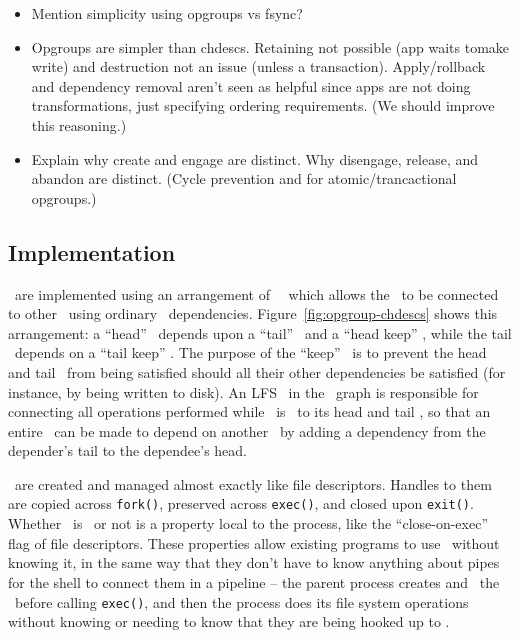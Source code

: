 \begin{itemize}
\item Mention simplicity using opgroups vs fsync?
\item Opgroups are simpler than chdescs. Retaining not possible (app
  waits tomake write) and destruction not an issue (unless a
  transaction). Apply/rollback and dependency removal aren't seen as
  helpful since apps are not doing transformations, just specifying
  ordering requirements. (We should improve this reasoning.)
\item Explain why create and engage are distinct. Why disengage,
  release, and abandon are distinct. (Cycle prevention and for
  atomic/trancactional opgroups.)
\end{itemize}

\subsection{Implementation}
\label{sec:opgroup:implementation}


\Opgroups\ are implemented using an arrangement of \noop\ \chdescs\ which allows
the \opgroup\ to be connected to other \opgroups\ using ordinary \chdesc\
dependencies.  Figure~\ref{fig:opgroup-chdescs} shows this arrangement: a
``head'' \chdesc\ depends upon a ``tail'' \chdesc\ and a ``head keep'' \chdesc,
while the tail \chdesc\ depends on a ``tail keep'' \chdesc. The purpose of the
``keep'' \chdescs\ is to prevent the head and tail \chdescs\ from being
satisfied should all their other dependencies be satisfied (for instance, by
being written to disk). An LFS \module\ in the \module\ graph is responsible for
connecting all operations performed while \anopgroup\ is \engaged\ to its head
and tail \chdescs, so that an entire \opgroup\ can be made to depend on another
\opgroup\ by adding a dependency from the depender's tail to the dependee's
head.

\Opgroups\ are created and managed almost exactly like file descriptors. Handles
to them are copied across \texttt{fork()}, preserved across \texttt{exec()}, and
closed upon \texttt{exit()}. Whether \anopgroup\ is \engaged\ or not is a
property local to the process, like the ``close-on-exec'' flag of file
descriptors. These properties allow existing programs to use \opgroups\ without
knowing it, in the same way that they don't have to know anything about pipes
for the shell to connect them in a pipeline -- the parent process creates and
\engages\ the \opgroups\ before calling \texttt{exec()}, and then the process
does its file system operations without knowing or needing to know that they are
being hooked up to \anopgroup.

